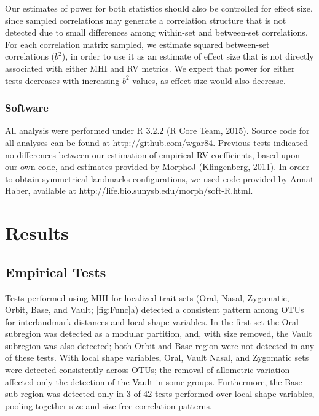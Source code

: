 \documentclass[12pt,twoside]{report}
\begin{document}
Our estimates of power for both statistics should also be controlled for
effect size, since sampled correlations may generate a correlation
structure that is not detected due to small differences among within-set
and between-set correlations. For each correlation matrix sampled, we
estimate squared between-set correlations ($b^2$), in order to use it as
an estimate of effect size that is not directly associated with either
MHI and RV metrics. We expect that power for either tests decreases with
increasing $b^2$ values, as effect size would also decrease.

\subsubsection{Software}\label{software}

All analysis were performed under R 3.2.2 (R Core Team, 2015). Source
code for all analyses can be found at \url{http://github.com/wgar84}.
Previous tests indicated no differences between our estimation of
empirical RV coefficients, based upon our own code, and estimates
provided by MorphoJ (Klingenberg, 2011). In order to obtain symmetrical
landmarks configurations, we used code provided by Annat Haber,
available at \url{http://life.bio.sunysb.edu/morph/soft-R.html}.

\section{Results}\label{results}

\subsection{Empirical Tests}\label{empirical-tests-1}

Tests performed using MHI for localized trait sets (Oral, Nasal,
Zygomatic, Orbit, Base, and Vault; \autoref{fig:Func}a) detected a
consistent pattern among OTUs for interlandmark distances and local
shape variables. In the first set the Oral subregion was detected as a
modular partition, and, with size removed, the Vault subregion was also
detected; both Orbit and Base region were not detected in any of these
tests. With local shape variables, Oral, Vault Nasal, and Zygomatic sets
were detected consistently across OTUs; the removal of allometric
variation affected only the detection of the Vault in some groups.
Furthermore, the Base sub-region was detected only in 3 of 42 tests
performed over local shape variables, pooling together size and
size-free correlation patterns.
\end{document}
